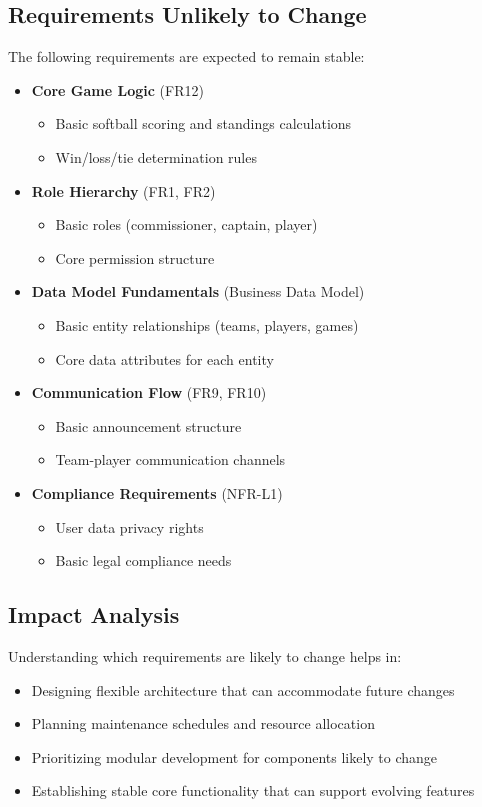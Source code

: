 \documentclass[12pt, titlepage]{article}
\begin{document}
\subsection{Requirements Unlikely to Change}
The following requirements are expected to remain stable:

\begin{itemize}
    \item \textbf{Core Game Logic} (FR12)
    \begin{itemize}
        \item Basic softball scoring and standings calculations
        \item Win/loss/tie determination rules
    \end{itemize}

    \item \textbf{Role Hierarchy} (FR1, FR2)
    \begin{itemize}
        \item Basic roles (commissioner, captain, player)
        \item Core permission structure
    \end{itemize}

    \item \textbf{Data Model Fundamentals} (Business Data Model)
    \begin{itemize}
        \item Basic entity relationships (teams, players, games)
        \item Core data attributes for each entity
    \end{itemize}

    \item \textbf{Communication Flow} (FR9, FR10)
    \begin{itemize}
        \item Basic announcement structure
        \item Team-player communication channels
    \end{itemize}

    \item \textbf{Compliance Requirements} (NFR-L1)
    \begin{itemize}
        \item User data privacy rights
        \item Basic legal compliance needs
    \end{itemize}
\end{itemize}

\subsection{Impact Analysis}
Understanding which requirements are likely to change helps in:
\begin{itemize}
    \item Designing flexible architecture that can accommodate future changes
    \item Planning maintenance schedules and resource allocation
    \item Prioritizing modular development for components likely to change
    \item Establishing stable core functionality that can support evolving features
\end{itemize}
\end{document}

